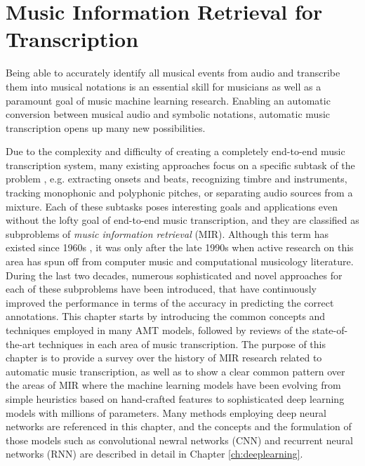 
\graphicspath{{2-mir/figures/}}

\chapter{Music Information Retrieval for Transcription}
\label{ch:mir}

Being able to accurately identify all musical events from audio and transcribe them into musical notations is an essential skill for musicians as well as a paramount goal of music machine learning research.
Enabling an automatic conversion between musical audio and symbolic notations, automatic music transcription opens up many new possibilities.


Due to the complexity and difficulty of creating a completely end-to-end music transcription system, many existing approaches focus on a specific subtask of the problem \cite{casey2008mir}, e.g. extracting onsets and beats, recognizing timbre and instruments, tracking monophonic and polyphonic pitches, or separating audio sources from a mixture.
Each of these subtasks poses interesting goals and applications even without the lofty goal of end-to-end music transcription, and they are classified as subproblems of \emph{music information retrieval} (MIR).
Although this term has existed since 1960s \cite{kassler1966mir}, it was only after the late 1990s when active research on this area has spun off from computer music and computational musicology literature.
During the last two decades, numerous sophisticated and novel approaches for each of these subproblems have been introduced, that have continuously improved the performance in terms of the accuracy in predicting the correct annotations.
This chapter starts by introducing the common concepts and techniques employed in many AMT models, followed by reviews of the state-of-the-art techniques in each area of music transcription.
The purpose of this chapter is to provide a survey over the history of MIR research related to automatic music transcription, as well as to show a clear common pattern over the areas of MIR where the machine learning models have been evolving from simple heuristics based on hand-crafted features to sophisticated deep learning models with millions of parameters.
Many methods employing deep neural networks are referenced in this chapter, and the concepts and the formulation of those models such as convolutional newral networks (CNN) and recurrent neural networks (RNN) are described in detail in Chapter \ref{ch:deeplearning}.



